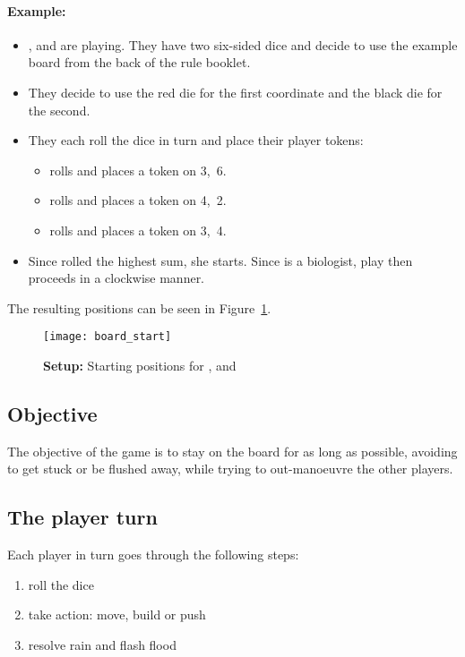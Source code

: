 \paragraph{Example:}
\begin{itemize}
    \item \Kim{}, \Rufus{} and \Xing{} are playing. They have two six-sided
        dice and decide to use the example board from the back of the rule
        booklet.
    \item They decide to use the red die for the first coordinate and the
        black die for the second.
    \item They each roll the dice in turn and place their player tokens:
        \begin{itemize}
            \item \Kim{} rolls   and places a token on 3,~6.
            \item \Rufus{} rolls   and places a token on 4,~2.
            \item \Xing{} rolls   and places a token on 3,~4.
        \end{itemize}
    \item Since \Kim{} rolled the highest sum, she starts. Since \Rufus{} is a
        biologist, play then proceeds in a clockwise manner.
\end{itemize}
The resulting positions can be seen in Figure~\ref{fig:start}.

\begin{figure}[t]
    \centering
    \texttt{[image: board\_start]}
    \caption{\textbf{Setup:} Starting positions for \Kim{}, \Rufus{} and
        \Xing{}}
    \label{fig:start}
\end{figure}

\subsection{Objective}
The objective of the game is to stay on the board for as long as possible,
avoiding to get stuck or be flushed away, while trying to out-manoeuvre the
other players.

\subsection{The player turn}
Each player in turn goes through the following steps:
\begin{enumerate}
    \item roll the dice
    \item take action: move, build or push
    \item resolve rain and flash flood
\end{enumerate}

